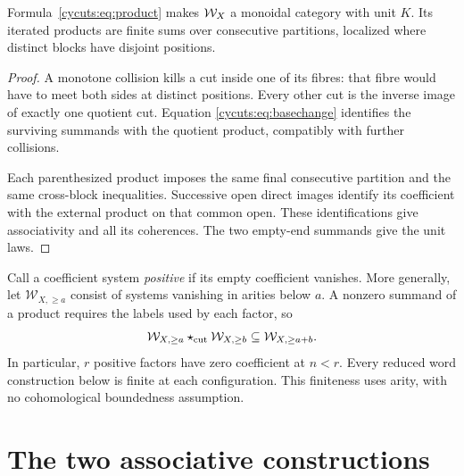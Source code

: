 \begin{proposition}\label{cycuts:prop:product}
Formula~\eqref{cycuts:eq:product} makes $\mathcal W_X$ a monoidal category with
unit $K$. Its iterated products are finite sums over consecutive
partitions, localized where distinct blocks have disjoint positions.
\end{proposition}
\begin{proof}
A monotone collision kills a cut inside one of its fibres: that fibre
would have to meet both sides at distinct positions. Every other cut
is the inverse image of exactly one quotient cut. Equation
\eqref{cycuts:eq:basechange} identifies the surviving summands with
the quotient product, compatibly with further collisions.

Each parenthesized product imposes the same final consecutive partition
and the same cross-block inequalities. Successive open direct images
identify its coefficient with the external product on that common open.
These identifications give associativity and all its coherences. The
two empty-end summands give the unit laws.
\end{proof}

Call a coefficient system \emph{positive} if its empty coefficient
vanishes. More generally, let $\mathcal W_{X,\ge a}$ consist of systems vanishing
in arities below $a$. A nonzero summand of a product requires the labels
used by each factor, so
\begin{equation}\label{cycuts:eq:arity}
 \mathcal W_{X,\ge a}\star_{\mathrm{cut}}\mathcal W_{X,\ge b}\subseteq\mathcal W_{X,\ge a+b}.
\end{equation}
In particular, $r$ positive factors have zero coefficient at $n<r$.
Every reduced word construction below is finite at each configuration.
This finiteness uses arity, with no cohomological boundedness assumption.

\section{The two associative constructions}
\label{cycuts:sec:bar}


